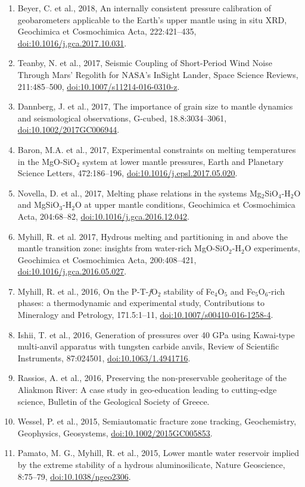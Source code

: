 \documentclass[11pt,twoside,a4paper]{article}
\newcommand{\doi}[1]{\href{http://dx.doi.org/#1}{doi:#1}}
\begin{document}
\begin{enumerate}
\item Beyer, C. et al., 2018, An internally consistent pressure calibration of geobarometers applicable to the Earth's upper mantle using in situ XRD, Geochimica et Cosmochimica Acta, 222:421--435, \doi{10.1016/j.gca.2017.10.031}.
\item Teanby, N. et al., 2017, Seismic Coupling of Short-Period Wind Noise Through Mars' Regolith for NASA's InSight Lander, Space Science Reviews, 211:485--500, \doi{10.1007/s11214-016-0310-z}.
\item Dannberg, J. et al., 2017, The importance of grain size to mantle dynamics and seismological observations, G-cubed, 18.8:3034--3061, \doi{10.1002/2017GC006944}.
\item Baron, M.A. et al., 2017, Experimental constraints on melting temperatures in the MgO-SiO$_2$ system at lower mantle pressures, Earth and Planetary Science Letters, 472:186--196, \doi{10.1016/j.epsl.2017.05.020}.
\item Novella, D. et al., 2017, Melting phase relations in the systems Mg$_2$SiO$_4$-H$_2$O and MgSiO$_3$-H$_2$O at upper mantle conditions, Geochimica et Cosmochimica Acta, 204:68--82, \doi{10.1016/j.gca.2016.12.042}.
\item Myhill, R. et al. 2017, Hydrous melting and partitioning in and above the mantle transition zone: insights from water-rich MgO-SiO$_2$-H$_2$O experiments, Geochimica et Cosmochimica Acta, 200:408--421, \doi{10.1016/j.gca.2016.05.027}.
\item Myhill, R. et al., 2016, On the P-T-\emph{f}O$_2$ stability of Fe$_4$O$_5$ and Fe$_5$O$_6$-rich phases: a thermodynamic and experimental study, Contributions to Mineralogy and Petrology, 171.5:1--11, \doi{10.1007/s00410-016-1258-4}.
 \item Ishii, T. et al., 2016, Generation of pressures over 40 GPa using Kawai-type multi-anvil apparatus with tungsten carbide anvils, Review of Scientific Instruments, 87:024501, \doi{10.1063/1.4941716}.
 \item Rassios, A. et al., 2016, Preserving the non-preservable geoheritage of the Aliakmon River: A case study in geo-education leading to cutting-edge science, Bulletin of the Geological Society of Greece.
\item  Wessel, P. et al., 2015, Semiautomatic fracture zone tracking, Geochemistry, Geophysics, Geosystems, \doi{10.1002/2015GC005853}.
\item Pamato, M. G., Myhill, R. et al., 2015, Lower mantle water reservoir implied by the extreme stability of a hydrous aluminosilicate, Nature Geoscience, 8:75--79, \doi{10.1038/ngeo2306}.

\end{enumerate}
\end{document}
